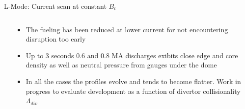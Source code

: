 \documentclass[10pt, compress]{beamer}
\newcommand\Fontvi{\fontsize{8}{7.2}\selectfont}
\begin{document}
\begin{frame}{L-Mode: Current scan at constant $B_{t}$}
\Fontvi
  \vspace{-1cm}
\begin{columns}
  \begin{column}{0.65\textwidth}
  \end{column}
  \begin{column}{0.35\textwidth}
    \begin{itemize}
      \item<1-> The fueling has been reduced at lower current for not
        encountering disruption too early
      \item<2-> Up to 3 seconds 0.6 and 0.8 MA discharges exibits close
        edge and core density as well as neutral pressure from gauges
        under the dome
      \item<3> In all the cases the profiles evolve and tends to
        become flatter. Work in progress to evaluate development as a
        function of divertor collisionality $\Lambda_{div}$
    \end{itemize}
  
  \end{column}
\end{columns}
\end{frame}
\end{document}
